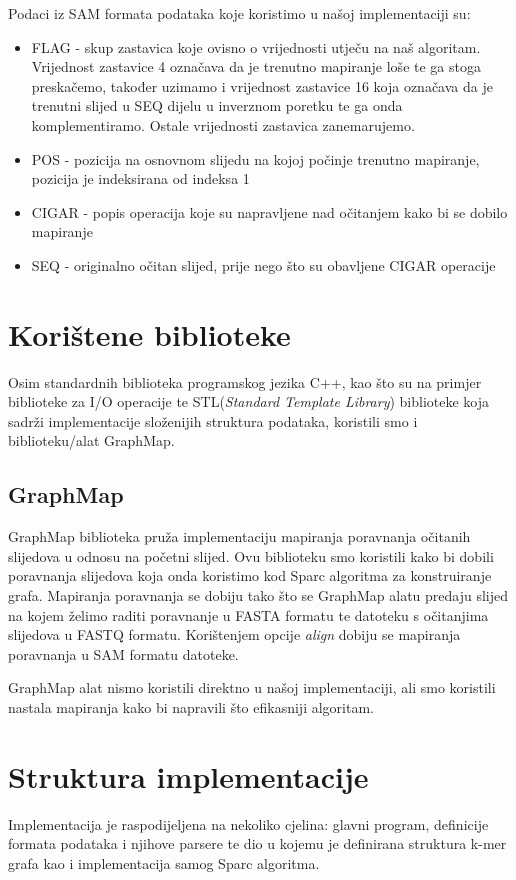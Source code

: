 \documentclass[times, utf8, seminar, numeric]{fer}
\begin{document}
Podaci iz SAM formata podataka koje koristimo u našoj implementaciji su:
\renewcommand{\labelitemi}{$\bullet$}
\begin{itemize}
	\item FLAG - skup zastavica koje ovisno o vrijednosti utječu na naš algoritam. Vrijednost zastavice 4 označava da je trenutno mapiranje loše te ga stoga preskačemo, također uzimamo i vrijednost zastavice 16 koja označava da je trenutni slijed u SEQ dijelu u inverznom poretku te ga onda komplementiramo. Ostale vrijednosti zastavica zanemarujemo.  
	\item POS - pozicija na osnovnom slijedu na kojoj počinje trenutno mapiranje, pozicija je indeksirana od indeksa 1
	\item CIGAR - popis operacija koje su napravljene nad očitanjem kako bi se dobilo mapiranje
	\item SEQ - originalno očitan slijed, prije nego što su obavljene CIGAR operacije
\end{itemize}

\section{Korištene biblioteke}
Osim standardnih biblioteka programskog jezika C++, kao što su na primjer biblioteke za I/O operacije te STL(\emph{Standard Template Library}) biblioteke koja sadrži implementacije složenijih struktura podataka, koristili smo i biblioteku/alat GraphMap.
\subsection{GraphMap}
GraphMap biblioteka pruža implementaciju mapiranja poravnanja očitanih slijedova u odnosu na početni slijed. Ovu biblioteku smo koristili kako bi dobili poravnanja slijedova koja onda koristimo kod Sparc algoritma za konstruiranje grafa. Mapiranja poravnanja se dobiju tako što se GraphMap alatu predaju slijed na kojem želimo raditi poravnanje u FASTA formatu te datoteku s očitanjima slijedova u FASTQ formatu. Korištenjem opcije \emph{align} dobiju se mapiranja poravnanja u SAM formatu datoteke.

GraphMap alat nismo koristili direktno u našoj implementaciji, ali smo koristili nastala mapiranja kako bi napravili što efikasniji algoritam.

\section{Struktura implementacije}
Implementacija je raspodijeljena na nekoliko cjelina: glavni program, definicije formata podataka i njihove parsere te dio u kojemu je definirana struktura k-mer grafa kao i implementacija samog Sparc algoritma.
\end{document}
